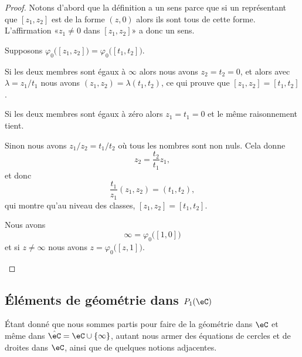 \begin{proof}
	Notons d'abord que la définition a un sens parce que si un représentant que \( [z_1,z_2]\) est de la forme \( (z,0)\) alors ils sont tous de cette forme. L'affirmation «\( z_1\neq 0\) dans \( [z_1,z_2]\)» a donc un sens.
	\begin{subproof}
		\spitem[Injectif]
		Supposons \( \varphi_0\big( [z_1,z_2] \big)=\varphi_0\big( [t_1,t_2] \big)\).

		Si les deux membres sont égaux à \( \infty\) alors nous avons \( z_2=t_2=0\), et alors avec \( \lambda=z_1/t_1\) nous avons \( (z_1,z_2)=\lambda (t_1,t_2)\), ce qui prouve que \( [z_1,z_2]=[t_1,t_2]\).

		Si les deux membres sont égaux à zéro alors \( z_1=t_1=0\) et le même raisonnement tient.

		Sinon nous avons \( z_1/z_2=t_1/t_2\) où tous les nombres sont non nuls. Cela donne
		\begin{equation}
			z_2=\frac{ t_2 }{ t_1 }z_1,
		\end{equation}
		et donc
		\begin{equation}
			\frac{ t_1 }{ z_1 }(z_1,z_2)=(t_1,t_2),
		\end{equation}
		qui montre qu'au niveau des classes, \( [z_1,z_2]=[t_1,t_2]\).

		\spitem[Surjectif]

		Nous avons
		\begin{equation}
			\infty=\varphi_0\big( [1,0] \big)
		\end{equation}
		et si \( z\neq \infty\) nous avons \( z=\varphi_0\big( [z,1] \big)\).
	\end{subproof}
\end{proof}

\subsection{Éléments de géométrie dans \( P_1(\eC)\)}
\label{SUBSECooQPRLooAjMNqp}

Étant donné que nous sommes partis pour faire de la géométrie dans \( \eC\) et même dans \( \hat \eC=\eC\cup \{ \infty \}\), autant nous armer des équations de cercles et de droites dans \( \eC\), ainsi que de quelques notions adjacentes.

